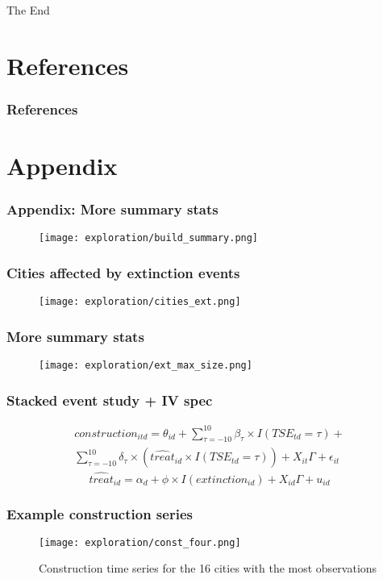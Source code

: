 \documentclass{beamer}
\begin{document}
\begin{frame}
\Huge{\centerline{The End}}
\end{frame}

\section{References}

\begin{frame}
\frametitle{References}
\justifying




\end{frame}


\section{Appendix}

\begin{frame}
\frametitle{Appendix: More summary stats}
\begin{figure}
    \centering
    \texttt{[image: exploration/build\_summary.png]}
    \label{fig:build_sum}
\end{figure}
\end{frame}

\begin{frame}
\frametitle{Cities affected by extinction events}
\begin{figure}
    \centering
    \texttt{[image: exploration/cities\_ext.png]}
    \label{fig:cities_ext}
\end{figure}
\end{frame}

\begin{frame}
\frametitle{More summary stats}
\begin{figure}
    \centering
    \texttt{[image: exploration/ext\_max\_size.png]}
    \label{fig:ext_max_size}
\end{figure}
\end{frame}

\begin{frame}
\frametitle{Stacked event study + IV spec}
\begin{equation}\label{eq:eventstudy}
\begin{split}
    construction_{itd} = \theta_{id} +  \sum_{\tau=-10}^{10}\beta_\tau \times I(TSE_{td}=\tau) + \\
    \sum_{\tau=-10}^{10} \delta_\tau \times (\widehat{treat}_{id} \times I(TSE_{td}=\tau)) + X_{it} \Gamma + \epsilon_{it}
\end{split}
\end{equation}
\bigskip
\begin{equation}\label{eq:firststage}
    \widehat{treat}_{id} = \alpha_d + \phi \times I(extinction_{id}) + X_{id} \Gamma + u_{id}
\end{equation}
\end{frame}

\begin{frame}
\frametitle{Example construction series}
\begin{figure}
    \centering
    \texttt{[image: exploration/const\_four.png]}
    \caption{Construction time series for the 16 cities with the most observations}
    \label{fig:const_four}
\end{figure}    
\end{frame}
\end{document}

